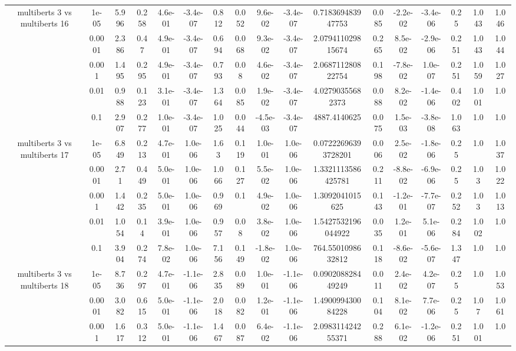\begin{tabular}{|c|c|c|c|c|c|c|c|c|c|c|c|c|c|c|c|c|}
\hline
\multirow{5}{*}{multiberts 3 vs multiberts 16} & 1e-05 & 5.996 & 0.258 & 4.6e-01 & -3.4e-07 & 0.812 & 0.052 & 9.6e-02 & -3.4e-07 & 0.718369483947753 & 0.085 & -2.2e-02 & -3.4e-06 & 0.25 & 1.043 & 1.046 \\
 & 0.0001 & 2.386 & 0.47 & 4.9e-01 & -3.4e-07 & 0.694 & 0.068 & 9.3e-02 & -3.4e-07 & 2.079411029815674 & 0.265 & 8.5e-02 & -2.9e-06 & 0.251 & 1.043 & 1.044 \\
 & 0.001 & 1.495 & 0.295 & 4.9e-01 & -3.4e-07 & 0.793 & 0.08 & 4.6e-02 & -3.4e-07 & 2.068711280822754 & 0.198 & -7.8e-02 & 1.0e-07 & 0.251 & 1.059 & 1.027 \\
 & 0.01 & 0.988 & 0.123 & 3.1e-01 & -3.4e-07 & 1.364 & 0.085 & 1.9e-02 & -3.4e-07 & 4.02790355682373 & 0.088 & 8.2e-02 & -1.4e-06 & 0.402 & 1.001 & 1.0 \\
 & 0.1 & 2.907 & 0.277 & 1.0e-01 & -3.4e-07 & 1.025 & 0.044 & -4.5e-03 & -3.4e-07 & 4887.4140625 & 0.075 & 1.5e-03 & -3.8e-08 & 1.063 & 1.0 & 1.0 \\
\hline
\multirow{5}{*}{multiberts 3 vs multiberts 17} & 1e-05 & 6.849 & 0.213 & 4.7e-01 & 1.0e-06 & 1.63 & 0.119 & 1.0e-01 & 1.0e-06 & 0.07222696393728201 & 0.006 & 2.5e-02 & -1.8e-06 & 0.25 & 1.0 & 1.037 \\
 & 0.0001 & 2.71 & 0.449 & 5.0e-01 & 1.0e-06 & 1.066 & 0.127 & 5.5e-02 & 1.0e-06 & 1.3321113586425781 & 0.211 & -8.8e-02 & -6.9e-06 & 0.25 & 1.03 & 1.022 \\
 & 0.001 & 1.442 & 0.235 & 5.0e-01 & 1.0e-06 & 0.969 & 0.1 & 4.9e-02 & 1.0e-06 & 1.3092041015625 & 0.143 & -1.2e-01 & -7.7e-07 & 0.252 & 1.03 & 1.013 \\
 & 0.01 & 1.054 & 0.14 & 3.9e-01 & 1.0e-06 & 0.957 & 0.08 & 3.8e-02 & 1.0e-06 & 1.5427532196044922 & 0.035 & 1.2e-01 & 5.1e-06 & 0.284 & 1.002 & 1.0 \\
 & 0.1 & 3.904 & 0.274 & 7.8e-02 & 1.0e-06 & 7.156 & 0.149 & -1.8e-02 & 1.0e-06 & 764.5501098632812 & 0.118 & -8.6e-02 & -5.6e-07 & 1.347 & 1.0 & 1.0 \\
\hline
\multirow{5}{*}{multiberts 3 vs multiberts 18} & 1e-05 & 8.736 & 0.297 & 4.7e-01 & -1.1e-06 & 2.835 & 0.089 & 1.0e-01 & -1.1e-06 & 0.090208828449249 & 0.011 & 2.4e-02 & 4.2e-07 & 0.25 & 1.0 & 1.053 \\
 & 0.0001 & 3.082 & 0.615 & 5.0e-01 & -1.1e-06 & 2.018 & 0.082 & 1.2e-01 & -1.1e-06 & 1.490099430084228 & 0.104 & 8.1e-02 & 7.7e-06 & 0.25 & 1.07 & 1.061 \\
 & 0.001 & 1.617 & 0.312 & 5.0e-01 & -1.1e-06 & 1.467 & 0.087 & 6.4e-02 & -1.1e-06 & 2.098311424255371 & 0.288 & 6.1e-02 & -1.2e-06 & 0.251 & 1.001 & 1.0 \\

\end{tabular}

